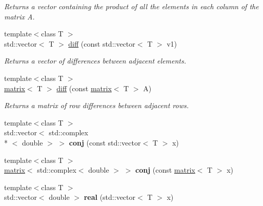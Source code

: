 \begin{DoxyCompactItemize}
\begin{DoxyCompactList}\small\item\em Returns a vector containing the product of all the elements in each column of the matrix A. \end{DoxyCompactList}\item 
\hypertarget{namespacekeycpp_aa4d7bfe3e5ee5f1b805e9aa64c5ba1e9}{{\footnotesize template$<$class T $>$ }\\std\-::vector$<$ T $>$ \hyperlink{namespacekeycpp_aa4d7bfe3e5ee5f1b805e9aa64c5ba1e9}{diff} (const std\-::vector$<$ T $>$ v1)}\label{namespacekeycpp_aa4d7bfe3e5ee5f1b805e9aa64c5ba1e9}

\begin{DoxyCompactList}\small\item\em Returns a vector of differences between adjacent elements. \end{DoxyCompactList}\item 
{\footnotesize template$<$class T $>$ }\\\hyperlink{classkeycpp_1_1matrix}{matrix}$<$ T $>$ \hyperlink{namespacekeycpp_a0cf08572a2b7b23b6be5365053770fa5}{diff} (const \hyperlink{classkeycpp_1_1matrix}{matrix}$<$ T $>$ A)
\begin{DoxyCompactList}\small\item\em Returns a matrix of row differences between adjacent rows. \end{DoxyCompactList}\item 
\hypertarget{namespacekeycpp_ad26d6a2ad64185a749c6f2e85aeaf62b}{{\footnotesize template$<$class T $>$ }\\std\-::vector$<$ std\-::complex\\*
$<$ double $>$ $>$ {\bfseries conj} (const std\-::vector$<$ T $>$ x)}\label{namespacekeycpp_ad26d6a2ad64185a749c6f2e85aeaf62b}

\item 
\hypertarget{namespacekeycpp_a5cbc9dd508d193697eb9dfbef01f1404}{{\footnotesize template$<$class T $>$ }\\\hyperlink{classkeycpp_1_1matrix}{matrix}$<$ std\-::complex$<$ double $>$ $>$ {\bfseries conj} (const \hyperlink{classkeycpp_1_1matrix}{matrix}$<$ T $>$ x)}\label{namespacekeycpp_a5cbc9dd508d193697eb9dfbef01f1404}

\item 
\hypertarget{namespacekeycpp_a76cd22caf522d677271fb915fb3aec37}{{\footnotesize template$<$class T $>$ }\\std\-::vector$<$ double $>$ {\bfseries real} (std\-::vector$<$ T $>$ x)}\label{namespacekeycpp_a76cd22caf522d677271fb915fb3aec37}


\end{DoxyCompactItemize}
